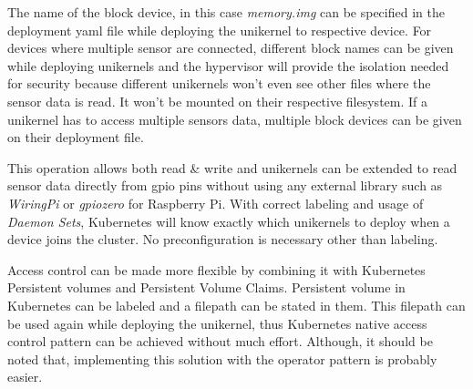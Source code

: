 The name of the block device, in this case \textit{memory.img} can be specified in the deployment yaml file while deploying the unikernel to respective device. For devices where multiple sensor are connected, different block names can be given while deploying unikernels and the hypervisor will provide the isolation needed for security because different unikernels won't even see other files where the sensor data is read. It won't be mounted on their respective filesystem. If a unikernel has to access multiple sensors data, multiple block devices can be given on their deployment file. 

This operation allows both read \& write and unikernels can be extended to read sensor data directly from gpio pins without using any external library such as \textit{WiringPi} or \textit{gpiozero} for Raspberry Pi. With correct labeling and usage of \textit{Daemon Sets}, Kubernetes will know exactly which unikernels to deploy when a device joins the cluster. No preconfiguration is necessary other than labeling.

Access control can be made more flexible by combining it with Kubernetes Persistent volumes and Persistent Volume Claims. Persistent volume in Kubernetes can be labeled and a filepath can be stated in them. This filepath can be used again while deploying the unikernel, thus Kubernetes native access control pattern can be achieved without much effort. Although, it should be noted that, implementing this solution with the operator pattern is probably easier.